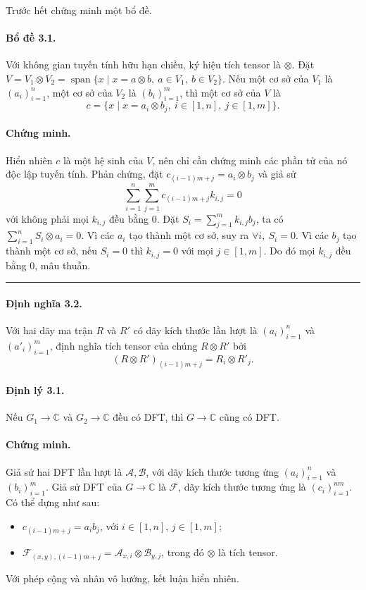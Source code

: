\documentclass[11pt]{article}
\begin{document}
Trước hết chứng minh một bổ đề.

\paragraph{Bổ đề 3.1.}
Với không gian tuyến tính hữu hạn chiều, ký hiệu tích tensor là $\otimes$. Đặt
$V=V_1\otimes V_2=\operatorname{span}\{x\mid x=a\otimes b,\ a\in V_1,\ b\in
V_2\}$. Nếu một cơ sở của $V_1$ là $(a_i)_{i=1}^{n}$, một cơ sở của $V_2$ là
$(b_i)_{i=1}^{m}$, thì một cơ sở của $V$ là
\[
  c=\{x\mid x=a_i\otimes b_j,\ i\in[1,n],\ j\in[1,m]\}.
\]

\paragraph{Chứng minh.}
Hiển nhiên $c$ là một hệ sinh của $V$, nên chỉ cần chứng minh các phần tử của
nó độc lập tuyến tính. Phản chứng, đặt
$c_{(i-1)m+j}=a_i\otimes b_j$ và giả sử
\[
  \sum_{i=1}^{n}\sum_{j=1}^{m} c_{(i-1)m+j}k_{i,j}=0
\]
với không phải mọi $k_{i,j}$ đều bằng $0$. Đặt
$S_i=\sum_{j=1}^{m} k_{i,j}b_j$, ta có $\sum_{i=1}^{n} S_i\otimes a_i=0$.
Vì các $a_i$ tạo thành một cơ sở, suy ra $\forall i,\ S_i=0$. Vì các $b_j$ tạo
thành một cơ sở, nếu $S_i=0$ thì $k_{i,j}=0$ với mọi $j\in[1,m]$. Do đó mọi
$k_{i,j}$ đều bằng $0$, mâu thuẫn. \hfill\rule{0.55em}{0.55em}

\paragraph{Định nghĩa 3.2.}
Với hai dãy ma trận $R$ và $R'$ có dãy kích thước lần lượt là $(a_i)_{i=1}^{n}$
và $(a'_i)_{i=1}^{m}$, định nghĩa tích tensor của chúng $R\otimes R'$ bởi
\[
  (R\otimes R')_{(i-1)m+j}=R_i\otimes R'_j.
\]

\paragraph{Định lý 3.1.}
Nếu $G_1\to\mathbb C$ và $G_2\to\mathbb C$ đều có DFT, thì
$G\to\mathbb C$ cũng có DFT.

\paragraph{Chứng minh.}
Giả sử hai DFT lần lượt là $\mathcal A,\mathcal B$, với dãy kích thước tương ứng
$(a_i)_{i=1}^{n}$ và $(b_i)_{i=1}^{m}$. Giả sử DFT của $G\to\mathbb C$ là
$\mathcal F$, dãy kích thước tương ứng là $(c_i)_{i=1}^{nm}$. Có thể dựng như
sau:
\begin{itemize}
  \item $c_{(i-1)m+j}=a_ib_j$, với $i\in[1,n]$, $j\in[1,m]$;
  \item $\mathcal F_{(x,y),(i-1)m+j}=\mathcal A_{x,i}\otimes\mathcal B_{y,j}$,
  trong đó $\otimes$ là tích tensor.
\end{itemize}
Với phép cộng và nhân vô hướng, kết luận hiển nhiên.
\end{document}
